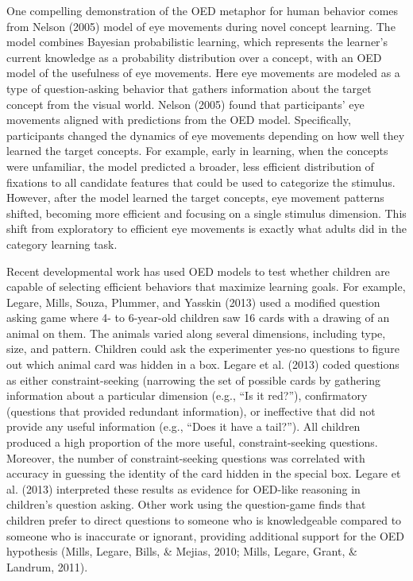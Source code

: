 \documentclass[english,floatsintext,man]{apa6}
\theoremstyle{definition}
\theoremstyle{definition}
\theoremstyle{definition}
\theoremstyle{remark}
\begin{document}
One compelling demonstration of the OED metaphor for human behavior
comes from Nelson (2005) model of eye movements during novel concept
learning. The model combines Bayesian probabilistic learning, which
represents the learner's current knowledge as a probability distribution
over a concept, with an OED model of the usefulness of eye movements.
Here eye movements are modeled as a type of question-asking behavior
that gathers information about the target concept from the visual world.
Nelson (2005) found that participants' eye movements aligned with
predictions from the OED model. Specifically, participants changed the
dynamics of eye movements depending on how well they learned the target
concepts. For example, early in learning, when the concepts were
unfamiliar, the model predicted a broader, less efficient distribution
of fixations to all candidate features that could be used to categorize
the stimulus. However, after the model learned the target concepts, eye
movement patterns shifted, becoming more efficient and focusing on a
single stimulus dimension. This shift from exploratory to efficient eye
movements is exactly what adults did in the category learning task.

Recent developmental work has used OED models to test whether children
are capable of selecting efficient behaviors that maximize learning
goals. For example, Legare, Mills, Souza, Plummer, and Yasskin (2013)
used a modified question asking game where 4- to 6-year-old children saw
16 cards with a drawing of an animal on them. The animals varied along
several dimensions, including type, size, and pattern. Children could
ask the experimenter yes-no questions to figure out which animal card
was hidden in a box. Legare et al. (2013) coded questions as either
constraint-seeking (narrowing the set of possible cards by gathering
information about a particular dimension (e.g., \enquote{Is it red?}),
confirmatory (questions that provided redundant information), or
ineffective that did not provide any useful information (e.g.,
\enquote{Does it have a tail?}). All children produced a high proportion
of the more useful, constraint-seeking questions. Moreover, the number
of constraint-seeking questions was correlated with accuracy in guessing
the identity of the card hidden in the special box. Legare et al. (2013)
interpreted these results as evidence for OED-like reasoning in
children's question asking. Other work using the question-game finds
that children prefer to direct questions to someone who is knowledgeable
compared to someone who is inaccurate or ignorant, providing additional
support for the OED hypothesis (Mills, Legare, Bills, \& Mejias, 2010;
Mills, Legare, Grant, \& Landrum, 2011).
\end{document}

